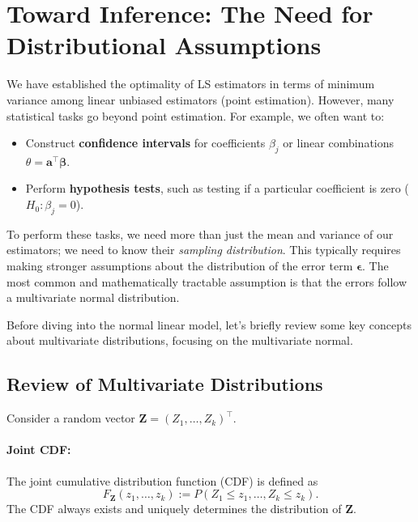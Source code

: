 \documentclass[11pt, letterpaper]{article}
\theoremstyle{plain} %
\theoremstyle{definition} %
\theoremstyle{remark} %
\begin{document}
\section{Toward Inference: The Need for Distributional Assumptions}

We have established the optimality of LS estimators in terms of minimum variance among linear unbiased estimators (point estimation). However, many statistical tasks go beyond point estimation. For example, we often want to:
\begin{itemize}
    \item Construct \textbf{confidence intervals} for coefficients $\beta_j$ or linear combinations $\theta = \boldsymbol{a}^{\top}\boldsymbol{\beta}$.
    \item Perform \textbf{hypothesis tests}, such as testing if a particular coefficient is zero ($H_0: \beta_j = 0$).
\end{itemize}
To perform these tasks, we need more than just the mean and variance of our estimators; we need to know their \emph{sampling distribution}. This typically requires making stronger assumptions about the distribution of the error term $\boldsymbol{\epsilon}$. The most common and mathematically tractable assumption is that the errors follow a multivariate normal distribution.

Before diving into the normal linear model, let's briefly review some key concepts about multivariate distributions, focusing on the multivariate normal.

\subsection{Review of Multivariate Distributions}

Consider a random vector $\boldsymbol{Z} = (Z_1, \ldots, Z_k)^{\top}$.

\paragraph{Joint CDF:} The joint cumulative distribution function (CDF) is defined as
\[ F_{\boldsymbol{Z}}(z_1, \ldots, z_k) := P(Z_1 \le z_1, \ldots, Z_k \le z_k). \]
The CDF always exists and uniquely determines the distribution of $\boldsymbol{Z}$.
\end{document}
